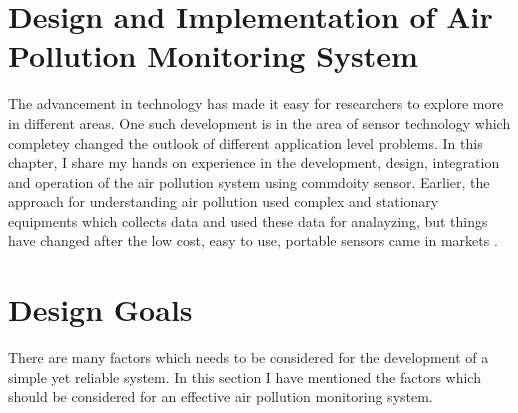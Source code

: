 \documentclass[11pt]{article}
\begin{document}
\section*{Design and Implementation of Air Pollution Monitoring System}

The advancement in technology has made it easy for researchers to explore more in different areas. One such development is in the area of sensor technology which completey changed the outlook of different application level problems. In this chapter, I share my hands on experience in the development, design, integration and operation of the air pollution system using commdoity sensor. Earlier, the approach for understanding air pollution used complex and stationary equipments which collects data and used these data for analayzing, but things have changed after the low cost, easy to use, portable sensors came in markets \cite{Snyder2013}. 

\section*{Design Goals}

There are many factors which needs to be considered for the development of a simple yet reliable system. In this section I have mentioned the factors which should be considered for an effective air pollution monitoring system.
\end{document}
